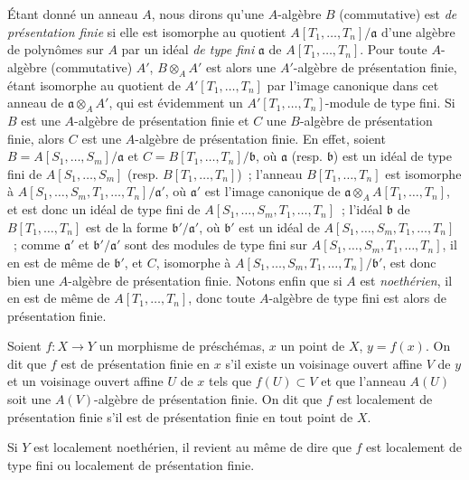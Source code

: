 \begin{env}[1.4.1]
\label{IV.1.4.1-fr}
Étant donné un anneau $A$, nous dirons qu'une $A$-algèbre $B$ (commutative)
est \emph{de présentation finie} si elle est isomorphe au quotient
$A[T_1,\ldots,T_n]/\mathfrak a$ d'une algèbre de polynômes sur $A$ par un
idéal \emph{de type fini} $\mathfrak a$ de $A[T_1,\ldots,T_n]$. Pour toute
$A$-algèbre (commutative) $A'$, $B\otimes_AA'$ est alors une $A'$-algèbre de
présentation finie, étant isomorphe au quotient de $A'[T_1,\ldots,T_n]$ par
l'image canonique dans cet anneau de $\mathfrak a\otimes_AA'$, qui est
évidemment un $A'[T_1,\ldots,T_n]$-module de type fini. Si $B$ est une
$A$-algèbre de présentation finie et $C$ une $B$-algèbre de présentation
finie, alors $C$ est une $A$-algèbre de présentation finie. En effet, soient
$B=A[S_1,\ldots,S_m]/\mathfrak a$ et
$C=B[T_1,\ldots,T_n]/\mathfrak b$, où $\mathfrak a$ (resp. $\mathfrak b$) est
un idéal de type fini de $A[S_1,\ldots,S_m]$ (resp.
$B[T_1,\ldots,T_n]$)~; l'anneau $B[T_1,\ldots,T_n]$ est isomorphe à
$A[S_1,\ldots,S_m,T_1,\ldots,T_n]/\mathfrak a'$, où $\mathfrak a'$ est
l'image canonique de
$\mathfrak a\otimes_AA[T_1,\ldots,T_n]$, et est donc un idéal de type fini de
$A[S_1,\ldots,S_m,T_1,\ldots,T_n]$~; l'idéal $\mathfrak b$ de
$B[T_1,\ldots,T_n]$ est de la forme $\mathfrak b'/\mathfrak a'$, où
$\mathfrak b'$ est un idéal de $A[S_1,\ldots,S_m,T_1,\ldots,T_n]$~; comme
$\mathfrak a'$ et $\mathfrak b'/\mathfrak a'$ sont des modules de type fini
sur $A[S_1,\ldots,S_m,T_1,\ldots,T_n]$, il en est de même de $\mathfrak b'$,
et $C$, isomorphe à
$A[S_1,\ldots,S_m,T_1,\ldots,T_n]/\mathfrak b'$, est donc bien une
$A$-algèbre de présentation finie. Notons enfin que si $A$ est
\emph{noethérien}, il en est de même de $A[T_1,\ldots,T_n]$, donc toute
$A$-algèbre de type fini est alors de présentation finie.
\end{env}

\begin{definition}[1.4.2]
\label{IV.1.4.2-fr}
Soient $f:X\to Y$ un morphisme de préschémas, $x$ un point de $X$, $y=f(x)$.
On dit que $f$ est de présentation finie en $x$ s'il existe un voisinage
ouvert affine $V$ de $y$ et un voisinage ouvert affine $U$ de $x$ tels que
$f(U)\subset V$ et que l'anneau $A(U)$ soit une $A(V)$-algèbre de présentation
finie. On dit que $f$ est localement de présentation finie s'il est de
présentation finie en tout point de $X$.
\end{definition}

Si $Y$ est localement noethérien, il revient au même de dire que $f$ est
localement de type fini ou localement de présentation finie.

